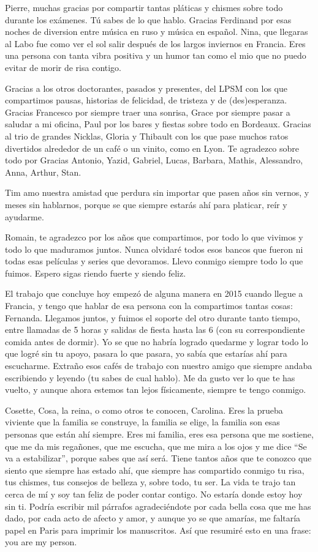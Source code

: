 Pierre, muchas gracias por compartir tantas pláticas y chismes sobre todo durante los exámenes. Tú sabes de lo que hablo. Gracias Ferdinand por esas noches de diversion entre música en ruso y música en español. Nina, que llegaras al Labo fue como ver el sol salir después de los largos inviernos en Francia. Eres una persona con tanta vibra positiva y un humor tan como el mio que no puedo evitar de morir de risa contigo.

Gracias a los otros doctorantes, pasados y presentes, del LPSM con los que compartimos pausas, historias de felicidad, de tristeza y de (des)esperanza. Gracias Francesco por siempre traer una sonrisa, Grace por siempre pasar a saludar a mi oficina, Paul por los bares y fiestas sobre todo en Bordeaux. Gracias al trio de grandes Nicklas, Gloria y Thibault con los que pase muchos ratos divertidos alrededor de un café o un vinito, como en Lyon. Te agradezco sobre todo por Gracias Antonio, Yazid, Gabriel, Lucas, Barbara, Mathis, Alessandro, Anna, Arthur, Stan.

Tim amo nuestra amistad que perdura sin importar que pasen años sin vernos, y meses sin hablarnos, porque se que siempre estarás ahí para platicar, reír y ayudarme. 

Romain, te agradezco por los años que compartimos, por todo lo que vivimos y todo lo que maduramos juntos. Nunca olvidaré todos esos bancos que fueron ni todas esas películas y series que devoramos. Llevo conmigo siempre todo lo que fuimos. Espero sigas riendo fuerte y siendo feliz.

El trabajo que concluye hoy empezó de alguna manera en 2015 cuando llegue a Francia, y tengo que hablar de esa persona con la compartimos tantas cosas: Fernanda. Llegamos juntos, y fuimos el soporte del otro durante tanto tiempo, entre llamadas de 5 horas y salidas de fiesta hasta las 6 (con su correspondiente comida antes de dormir). Yo se que no habría logrado quedarme y lograr todo lo que logré sin tu apoyo, pasara lo que pasara, yo sabía que estarías ahí para escucharme. Extraño esos cafés de trabajo con nuestro amigo que siempre andaba escribiendo y leyendo (tu sabes de cual hablo). Me da gusto ver lo que te has vuelto, y aunque ahora estemos tan lejos físicamente, siempre te tengo conmigo. 

Cosette, Cosa, la reina, o como otros te conocen, Carolina. Eres la prueba viviente que la familia se construye, la familia se elige, la familia son esas personas que están ahí siempre. Eres mi familia, eres esa persona que me sostiene, que me da mis regañones, que me escucha, que me mira a los ojos y me dice “Se va a estabilizar”, porque sabes que así será. Tiene tantos años que te conozco que siento que siempre has estado ahí, que siempre has compartido conmigo tu risa, tus chismes, tus consejos de belleza y, sobre todo, tu ser. La vida te trajo tan cerca de mí y soy tan feliz de poder contar contigo. No estaría donde estoy hoy sin ti. Podría escribir mil párrafos agradeciéndote por cada bella cosa que me has dado, por cada acto de afecto y amor, y aunque yo se que amarías, me faltaría papel en Paris para imprimir los manuscritos. Así que resumiré esto en una frase: you are my person.

